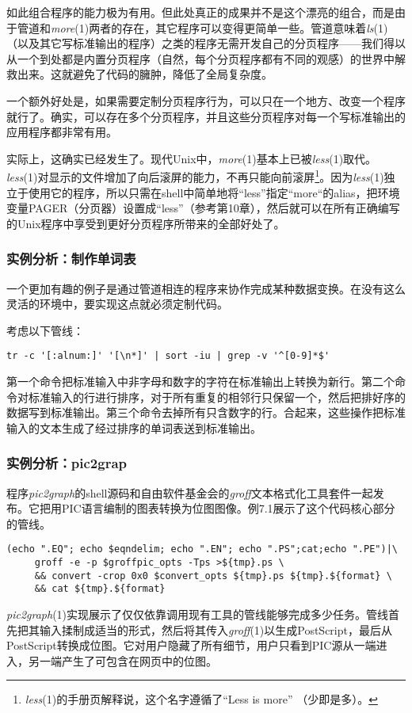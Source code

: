 \documentclass[12pt,oneside]{ctexbook}
\begin{document}
\begin{common-format}
如此组合程序的能力极为有用。但此处真正的成果并不是这个漂亮的组合，而是由于管道和\textit{more}(1)两者的存在，其它程序可以变得更简单一些。管道意味着\textit{ls}(1)（以及其它写标准输出的程序）之类的程序无需开发自己的分页程序——我们得以从一个到处都是内置分页程序（自然，每个分页程序都有不同的观感）的世界中解救出来。这就避免了代码的臃肿，降低了全局复杂度。

一个额外好处是，如果需要定制分页程序行为，可以只在一个地方、改变一个程序就行了。确实，可以存在多个分页程序，并且这些分页程序对每一个写标准输出的应用程序都非常有用。

实际上，这确实已经发生了。现代Unix中，\textit{more}(1)基本上已被\textit{less}(1)取代。\textit{less}(1)对显示的文件增加了向后滚屏的能力，不再只能向前滚屏\footnote{\textit{less}(1)的手册页解释说，这个名字遵循了“Less is more”  （少即是多）。}。因为\textit{less}(1)独立于使用它的程序，所以只需在shell中简单地将“less”指定“more“的alias，把环境变量PAGER（分页器）设置成“less”（参考第10章），然后就可以在所有正确编写的Unix程序中享受到更好分页程序所带来的全部好处了。



\subsubsection{实例分析：制作单词表}
一个更加有趣的例子是通过管道相连的程序来协作完成某种数据变换。在没有这么灵活的环境中，要实现这点就必须定制代码。

考虑以下管线：
\begin{Verbatim}
tr -c '[:alnum:]' '[\n*]' | sort -iu | grep -v '^[0-9]*$'
\end{Verbatim}

第一个命令把标准输入中非字母和数字的字符在标准输出上转换为新行。第二个命令对标准输入的行进行排序，对于所有重复的相邻行只保留一个，然后把排好序的数据写到标准输出。第三个命令去掉所有只含数字的行。合起来，这些操作把标准输入的文本生成了经过排序的单词表送到标准输出。


\subsubsection{实例分析：pic2grap}
程序\textit{pic2graph}的shell源码和自由软件基金会的\textit{groff}文本格式化工具套件一起发布。它把用PIC语言编制的图表转换为位图图像。例7.1展示了这个代码核心部分的管线。

\begin{Verbatim}[label=例7.1 pic2grah管线]
(echo ".EQ"; echo $eqndelim; echo ".EN"; echo ".PS";cat;echo ".PE")|\
     groff -e -p $groffpic_opts -Tps >${tmp}.ps \
     && convert -crop 0x0 $convert_opts ${tmp}.ps ${tmp}.${format} \
     && cat ${tmp}.${format}
\end{Verbatim}
\textit{pic2graph}(1)实现展示了仅仅依靠调用现有工具的管线能够完成多少任务。管线首先把其输入揉制成适当的形式，然后将其传入\textit{groff}(1)以生成PostScript，最后从PostScript转换成位图。它对用户隐藏了所有细节，用户只看到PIC源从一端进入，另一端产生了可包含在网页中的位图。


\end{common-format}
\end{document}
